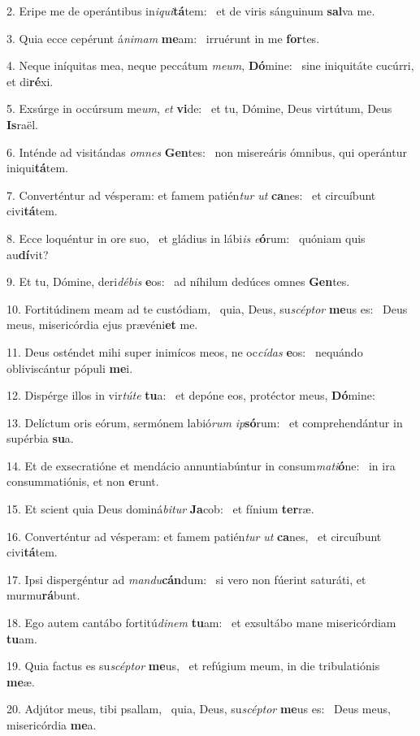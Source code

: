 2. Eripe me de operántibus in\textit{i}\textit{qui}\textbf{tá}tem: \ast\  et de viris sánguinum \textbf{sal}va me.\

3. Quia ecce cepérunt á\textit{ni}\textit{mam} \textbf{me}am: \ast\  irruérunt in me \textbf{for}tes.\

4. Neque iníquitas mea, neque peccátum \textit{me}\textit{um}, \textbf{Dó}mine: \ast\  sine iniquitáte cucúrri, et di\textbf{ré}xi.\

5. Exsúrge in occúrsum me\textit{um}, \textit{et} \textbf{vi}de: \ast\  et tu, Dómine, Deus virtútum, Deus \textbf{Is}raël.\

6. Inténde ad visitándas \textit{om}\textit{nes} \textbf{Gen}tes: \ast\  non misereáris ómnibus, qui operántur iniqui\textbf{tá}tem.\

7. Converténtur ad vésperam: et famem patién\textit{tur} \textit{ut} \textbf{ca}nes: \ast\  et circuíbunt civi\textbf{tá}tem.\

8. Ecce loquéntur in ore suo, \dag\  et gládius in lábi\textit{is} \textit{e}\textbf{ó}rum: \ast\  quóniam quis au\textbf{dí}vit?\

9. Et tu, Dómine, deri\textit{dé}\textit{bis} \textbf{e}os: \ast\  ad níhilum dedúces omnes \textbf{Gen}tes.\

10. Fortitúdinem meam ad te custódiam, \dag\  quia, Deus, su\textit{scép}\textit{tor} \textbf{me}us es: \ast\  Deus meus, misericórdia ejus prævéni\textbf{et} me.\

11. Deus osténdet mihi super inimícos meos, ne oc\textit{cí}\textit{das} \textbf{e}os: \ast\  nequándo obliviscántur pópuli \textbf{me}i.\

12. Dispérge illos in vir\textit{tú}\textit{te} \textbf{tu}a: \ast\  et depóne eos, protéctor meus, \textbf{Dó}mine:\

13. Delíctum oris eórum, sermónem labió\textit{rum} \textit{ip}\textbf{só}rum: \ast\  et comprehendántur in supérbia \textbf{su}a.\

14. Et de exsecratióne et mendácio annuntiabúntur in consum\textit{ma}\textit{ti}\textbf{ó}ne: \ast\  in ira consummatiónis, et non \textbf{e}runt.\

15. Et scient quia Deus dominá\textit{bi}\textit{tur} \textbf{Ja}cob: \ast\  et fínium \textbf{ter}ræ.\

16. Converténtur ad vésperam: et famem patién\textit{tur} \textit{ut} \textbf{ca}nes, \ast\  et circuíbunt civi\textbf{tá}tem.\

17. Ipsi dispergéntur ad \textit{man}\textit{du}\textbf{cán}dum: \ast\  si vero non fúerint saturáti, et murmu\textbf{rá}bunt.\

18. Ego autem cantábo fortitú\textit{di}\textit{nem} \textbf{tu}am: \ast\  et exsultábo mane misericórdiam \textbf{tu}am.\

19. Quia factus es su\textit{scép}\textit{tor} \textbf{me}us, \ast\  et refúgium meum, in die tribulatiónis \textbf{me}æ.\

20. Adjútor meus, tibi psallam, \dag\  quia, Deus, su\textit{scép}\textit{tor} \textbf{me}us es: \ast\  Deus meus, misericórdia \textbf{me}a.\

